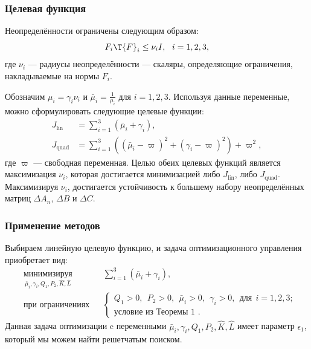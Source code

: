 \begin{frame}
	\frametitle{Целевая функция}
	Неопределённости ограничены следующим образом:
	\begin{equation}
		{F}_i\T{F}_i\leq \nu_i {I}, \ \ i=1,2,3,
	\end{equation}
	где $\nu_i$ --- радиусы неопределённости --- скаляры, определяющие ограничения, накладываемые на нормы ${F}_i$. 
	
	Обозначим $\mu_i=\gamma_i\nu_i$ и $\bar{\mu}_i=\frac{1}{\mu_i}$ для $i=1,2,3$.
	Используя данные переменные, можно сформулировать следующие целевые функции:
	\begin{align}
		\label{eq:cost_lin}
		J_\text{lin} &= \sum_{i=1}^{3}\left(\bar{\mu}_i+\gamma_i\right), \\ 
		\label{eq:cost_quad}
		J_\text{quad} & =  \sum_{i=1}^{3}\left((\bar{\mu}_i-\varpi)^2+(\gamma_i-\varpi)^2\right) + \varpi^2,
	\end{align}
	где $\varpi$ --- свободная переменная. Целью обеих целевых функций является максимизация $\nu_i$, которая достигается минимизацией либо $J_\text{lin}$, либо $J_\text{quad}$. Максимизируя $\nu_i$, достигается устойчивость к большему набору неопределённых матриц $\Delta {A}_n$, $\Delta {B}$ и $\Delta {C}$.
\end{frame}

\begin{frame}
	\frametitle{Применение методов}
	Выбираем линейную целевую функцию, и задача оптимизационного управления приобретает вид:
	\begin{equation}
		\label{eq:thm4_OCP}
		\begin{aligned}
			& \underset{\bar{\mu}_i,\gamma_i,{Q}_1, {P}_2,\hat{{K}} , \hat{{L}} }{\text{минимизируя}}
			& &  \sum_{i=1}^{3}\left(\bar{\mu}_i+\gamma_i\right), \\
			& \text{при ограничениях}
			& & \begin{cases}
				{Q}_1>0, \ \
				{P}_2>0, \ \
				\bar{\mu}_i>0, \ \
				\gamma_i>0, \ \
				\text{для} \ \ i=1,2,3; \\
				\text{условие из Теоремы 1 }.
			\end{cases}
		\end{aligned}
	\end{equation}
	Данная задача оптимизации c переменными $\bar{\mu}_i,\gamma_i,{Q}_1, {P}_2,\hat{{K}}, \hat{{L}}$ имеет параметр $\epsilon_1$, который мы можем найти решетчатым поиском.
\end{frame}

